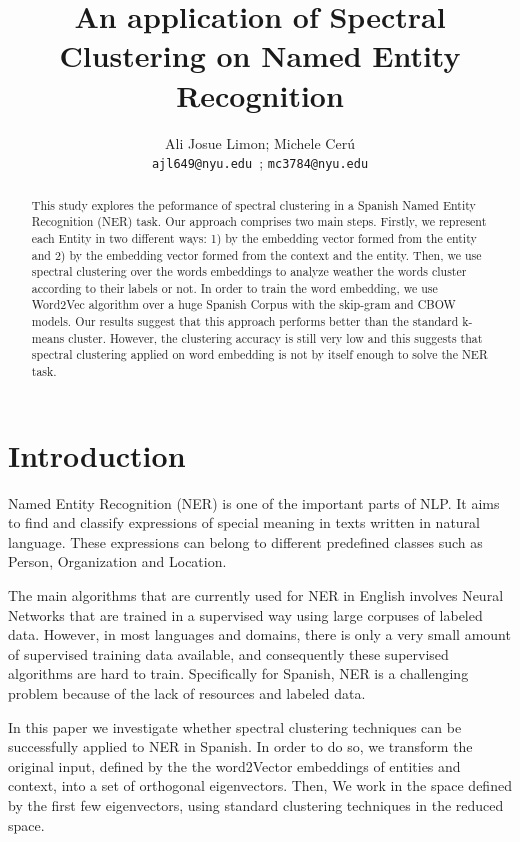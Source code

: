 \documentclass[]{article}
\title{An application of Spectral Clustering on Named Entity Recognition}
\author{Ali Josue Limon; Michele Cer\'u \\ 
	\texttt{ajl649@nyu.edu }; \texttt{mc3784@nyu.edu}
}
\begin{document}
	\maketitle
	\newcommand{\slugmaster}{%
		\slugger{siads}{xxxx}{xx}{x}{x---x}}%
	
	
	
	\begin{abstract}
		This study explores the peformance of spectral clustering in a Spanish Named Entity Recognition (NER) task. Our approach comprises two main steps. Firstly, we represent each Entity in two different ways: 1) by the embedding vector formed from the entity and 2) by the embedding vector formed from the context and the entity.  Then, we use spectral clustering over the words embeddings  to analyze weather the words cluster according to their labels or not.  In order to train the word embedding, we use Word2Vec algorithm over a huge Spanish Corpus with the skip-gram and CBOW models. Our results suggest that this approach performs better than the standard k-means cluster. However, the clustering accuracy is still very low and this suggests that spectral clustering applied on word embedding is not by itself enough to solve the NER task. 
		
	\end{abstract}
	
	\section{Introduction}
	
	Named Entity Recognition (NER) is one of the important parts of NLP. It aims to find and classify expressions of special meaning in texts written in natural language.  These expressions can belong to different predefined classes such as Person, Organization and Location. 
	
	The main algorithms that are currently used for NER in English involves Neural Networks that are trained in a supervised way using large corpuses of labeled data. However, in most languages and domains, there is only a very small amount of supervised training data available, and consequently these supervised algorithms are hard to train. Specifically for Spanish, NER is a challenging problem because of the lack of resources and labeled data. 
	
	In this paper we investigate whether spectral clustering techniques can be successfully applied to NER in Spanish. In order to do so, we transform the original input, defined by the the word2Vector embeddings of entities and context, into a set of orthogonal eigenvectors. Then, We work in the space defined by the first few eigenvectors, using standard clustering techniques in the reduced space.
	
\end{document}
